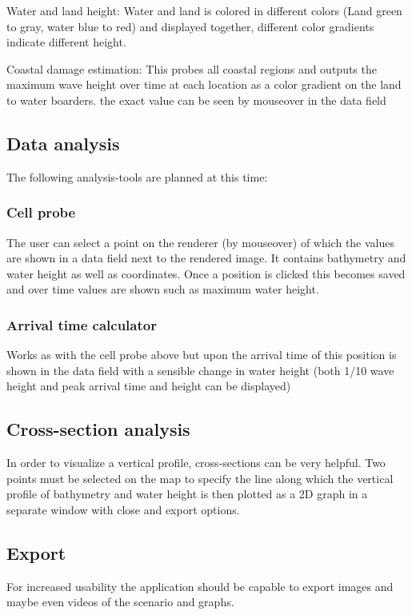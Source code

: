 \documentclass[paper=a4]{proc}
\begin{document}
			Water and land height: \newline
			Water and land is colored in different colors (Land green to gray, water blue to red) and displayed together, 					different color gradients indicate different height.
			
			Coastal damage estimation: \newline
		 This probes all coastal regions and outputs the maximum wave height over time at each location as a color gradient on the land to water boarders. the exact value can be seen by mouseover in the data field 
 		\subsection{Data analysis}
			The following analysis-tools are planned at this time:
			\subsubsection*{Cell probe}
				The user can select a point on the renderer (by mouseover) of which the values are shown in a data field next to the rendered image. It contains bathymetry and water height as well as coordinates. Once a position is clicked this becomes saved and over time values are shown such as maximum water height.
			\subsubsection*{Arrival time calculator}
				Works as with the cell probe above but upon the arrival time of this position is shown in the data field with a sensible change in water height (both 1/10 wave height and peak arrival time and height can be displayed)
			
			\subsection*{Cross-section analysis}
				In order to visualize a vertical profile, cross-sections can be very helpful. Two points must be selected on the map to specify the line along which the vertical profile of bathymetry and water height is then plotted as a 2D graph in a separate window with close and export options.
		\subsection{Export}
			For increased usability the application should be capable to export images and maybe even videos of the scenario and graphs.
\end{document}
